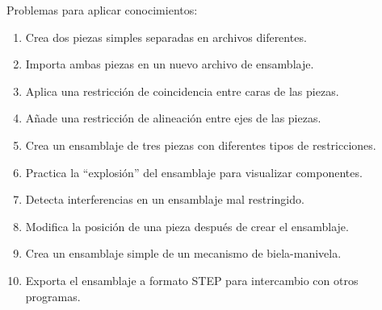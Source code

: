 Problemas para aplicar conocimientos:
\begin{enumerate}
	\item Crea dos piezas simples separadas en archivos
	      diferentes.
	\item Importa ambas piezas en un nuevo archivo de
	      ensamblaje.
	\item Aplica una restricción de coincidencia entre
	      caras de las piezas.
	\item Añade una restricción de alineación entre
	      ejes de las piezas.
	\item Crea un ensamblaje de tres piezas con diferentes
	      tipos de restricciones.
	\item Practica la ``explosión'' del ensamblaje para
	      visualizar componentes.
	\item Detecta interferencias en un ensamblaje
	      mal restringido.
	\item Modifica la posición de una pieza después de
	      crear el ensamblaje.
	\item Crea un ensamblaje simple de un mecanismo
	      de biela-manivela.
	\item Exporta el ensamblaje a formato STEP para
	      intercambio con otros programas.
\end{enumerate}